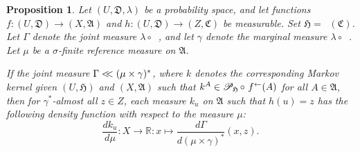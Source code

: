 \documentclass[
twoside=true,
paper=letter,
fontsize=9pt,
pagesize=auto,
leqno,
openany,
headsepline,
overfullrule,
]{scrbook}
\theoremstyle{plain}
\theoremstyle{plain}
\newtheorem{prop}[thm]{Proposition}
\theoremstyle{definition}
\theoremstyle{bfnoteitalic}
\theoremstyle{bfnoteroman}
\newcommand{\sigalg}[1]{\mathfrak{#1}}
\newcommand{\cali}[1]{\mathscr{#1}}
\newcommand{\condprobop}[1]{\mathop{\cali{P}\hspace{-1pt}}\nolimits_{#1}}
\newcommand{\textsigma}{\hbox{\large{$\sigma$}}\kern-1pt}
\newcommand{\preimage}[1]{\mathop{#1^{\leftarrow}}}
\newcommand{\R}{\mathbb{R}}
\newcommand{\sigmaalgebra}{\sigalg{A}}
\newcommand{\sigmaalgebraiii}{\sigalg{C}}
\newcommand{\funch}{h}
\newcommand{\funck}{k}
\newcommand{\function}{f}
\newcommand{\functioniii}{h}
\newcommand{\measurespace}{X}
\newcommand{\measurespaceiii}{Z}
\newcommand{\mspaceelt}{x}
\newcommand{\mspaceeltiii}{z}
\newcommand{\abscont}{\mathrel{< \kern-3.5pt <}}
\newcommand{\measure}{\mu}
\newcommand{\measmu}{\mu}
\newcommand{\measureiii}{\lambda}
\newcommand{\measlambda}{\lambda}
\newcommand{\seti}{A}
\newcommand{\uspace}{U}%
\newcommand{\uspaceelt}{u}
\newcommand{\uspacesig}{\sigalg{D}}
\newcommand{\measonprod}{\Gamma}%
\newcommand{\marginalthree}{\gamma}
\begin{document}
\begin{prop}\label{conditional_density}
Let
$(\uspace, \uspacesig, \measureiii)$
be a probability space, and let functions
$\function:(\uspace,\uspacesig)\to (\measurespace,\sigmaalgebra)$
and
$\functioniii:(\uspace,\uspacesig)\to (\measurespaceiii,\sigmaalgebraiii)$
be measurable. Set
$\sigalg{H} = \preimage{\functioniii}(\sigmaalgebraiii)$.
Let $\measonprod$ denote the joint measure $\measureiii\circ\preimage{(\function,\functioniii)}$,
and let $\marginalthree$ denote the marginal measure $\measlambda\circ\preimage{\funch}$.
Let $\measmu$ be a \textsigma\hyp{}finite reference measure on
$\sigmaalgebra$.

If the joint measure
$\measonprod\abscont (\measmu\times\marginalthree)^*$, where
$\funck$
denotes the corresponding Markov kernel given
$(\uspace,\sigalg{H})$ and $(\measurespace,\sigmaalgebra)$ such that
$\funck^\seti\in
\condprobop{\sigalg{H}}\circ\, \preimage{\function}(\seti)$
for all $\seti\in\sigmaalgebra$,
then
for $\marginalthree^*$\hyp{}almost all $\mspaceeltiii\in\measurespaceiii$, each measure
$\funck_\uspaceelt$
on $\sigmaalgebra$ such that $\funch(\uspaceelt) = \mspaceeltiii$
has the following density function with respect to the measure
$\measure$:
\[
\frac{d \funck_\uspaceelt}{d \measure}
:\measurespace\to\R
:\mspaceelt\mapsto
\frac{d\measonprod}{d(\measure\times\marginalthree)^*}
( \mspaceelt,\mspaceeltiii ).
\]
\end{prop}
\end{document}
